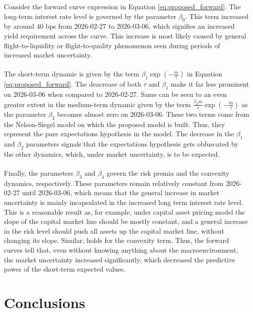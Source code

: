 \documentclass[a4paper]{artikel3}
\numberwithin{equation}{section}
\numberwithin{theorem}{section}
\numberwithin{proposition}{section}
\numberwithin{lemma}{section}
\begin{document}
Consider the forward curve expression in Equation \eqref{eq:proposed_forward}. The long-term interest rate level is governed by the parameter $\beta_0$. This term increased by around $40$ bps from 2026-02-27 to 2026-03-06, which signifies an increased yield requirement across the curve. This increase is most likely caused by general flight-to-liquidity or flight-to-quality phenomenon seen during periods of increased market uncertainty. \\
\\
The short-term dynamic is given by the term $\beta_1 \exp \left( -\frac{m}{\tau} \right)$ in Equation \eqref{eq:proposed_forward}. The deacrease of both $\tau$ and $\beta_1$ make it far less prominent on 2026-03-06 when compared to 2026-02-27. Same can be seen to an even greater extent in the medium-term dynamic given by the term $\frac{\beta_2m}{\tau} \exp \left( -\frac{m}{\tau} \right)$ as the parameter $\beta_2$ becomes almost zero on 2026-03-06. These two terms come from the Nelson-Siegel model on which the proposed model is built. Thus, they represent the pure expectations hypothesis in the model. The decrease in the $\beta_1$ and $\beta_2$ parameters signals that the expectations hypothesis gets obfuscated by the other dynamics, which, under market uncertainty, is to be expected. \\
\\
Finally, the parameters $\beta_3$ and $\beta_4$ govern the risk premia and the convexity dynamics, respectively. These parameters remain relatively constant from 2026-02-27 until 2026-03-06, which means that the general increase in market uncertainty is mainly incapsulated in the increased long term interest rate level. This is a reasonable result as, for example, under capital asset pricing model the slope of the capital market line should be mostly constant, and a general increase in the risk level should push all assets up the capital market line, without changing its slope. Similar, holds for the convexity term. Thus, the forward curves tell that, even without knowing anything about the macroenvironment, the market uncertainty increased significantly, which decreased the predictive power of the short-term expected values.



\clearpage


\section{Conclusions}
\label{sec:conclusions}
\end{document}
